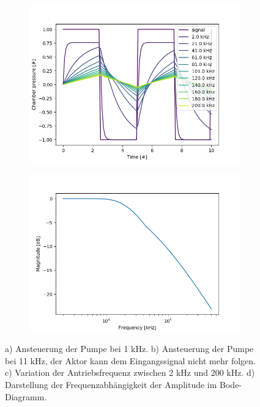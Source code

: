 \documentclass[fontsize=12pt, a4paper]{scrartcl}
\begin{document}
\begin{figure}[H]
\begin{subfigure}[H]{0.48\textwidth}
        \includegraphics[width=\textwidth, valign=t]{bilder/frequency/frequency_sweep.png}
    \end{subfigure}
    \begin{subfigure}[H]{0.48\textwidth}
        \includegraphics[width=\textwidth, valign=t]{bilder/frequency/bode_diagram.png}
    \end{subfigure}
    \caption{a) Ansteuerung der Pumpe bei 1 kHz. b) Ansteuerung der Pumpe bei 11 kHz, der Aktor kann dem Eingangssignal nicht mehr folgen. c) Variation der Antriebsfrequenz zwischen 2 kHz und 200 kHz. d) Darstellung der Frequenzabhängigkeit der Amplitude im Bode-Diagramm.}
    \label{fig:frequency_all}
\end{figure}
\end{document}
